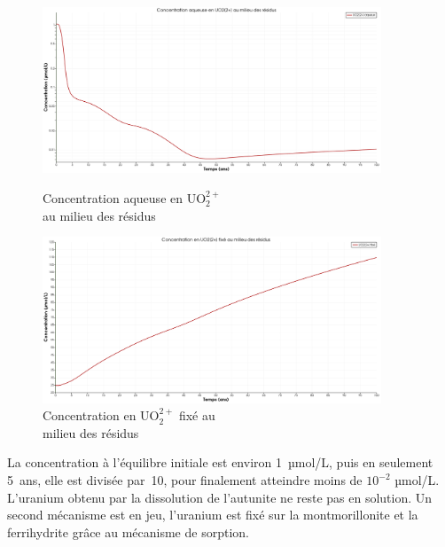 \documentclass{article}
\begin{document}
\begin{figure}[H]
    \centering
    \begin{minipage}{0.5\textwidth}
        \centering
        \includegraphics[width=0.9\textwidth]{III_B_2_3.png} 
        \caption{Concentration aqueuse en UO$_2^{2+}$ \\ au milieu des résidus}
        \label{fig:UO2_residus_sable_base}
    \end{minipage}\hfill
    \begin{minipage}{0.5\textwidth}
        \centering
        \includegraphics[width=0.9\textwidth]{III_B_2_4.png} 
        \caption{Concentration en UO$_2^{2+}$ fixé au \\milieu des résidus}
        \label{fig:UO2_fixe_residus_sable_base}
    \end{minipage}
\end{figure}

La concentration à l’équilibre initiale est environ 1~µmol/L, puis en seulement 5~ans, elle est divisée par~10, pour finalement atteindre moins de $10^{-2}$ µmol/L. L’uranium obtenu par la dissolution de l'autunite ne reste pas en solution. Un second mécanisme est en jeu, l'uranium est fixé sur la montmorillonite et la ferrihydrite grâce au mécanisme de sorption.
\end{document}
